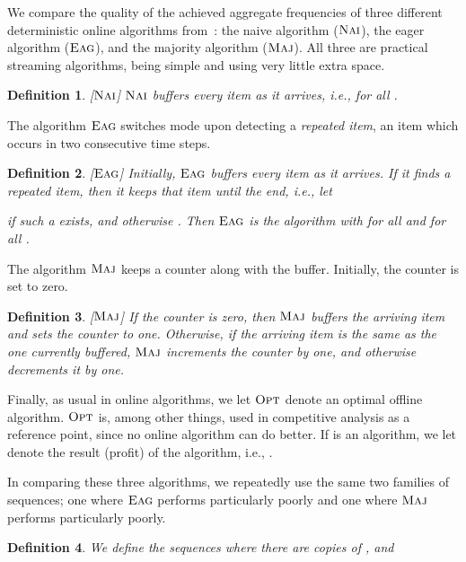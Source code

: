 \documentclass[11pt]{article}
\newtheorem{xdefinition}{Definition}
\newenvironment{definition}{\begin{xdefinition}\rm}{\hspace*{\fill}\raisebox{-1pt}{\boldmath}\end{xdefinition}}
\newcommand{\opt}{{\ensuremath{\textsc{Opt}}}\xspace}
\newcommand{\maj}{{\ensuremath{\textsc{Maj}}}\xspace}
\newcommand{\nav}{{\ensuremath{\textsc{Nai}}}\xspace}
\newcommand{\eag}{{\ensuremath{\textsc{Eag}}}\xspace}
\newcommand{\majnospace}{{\ensuremath{\textsc{Maj}}}}
\newcommand{\navnospace}{{\ensuremath{\textsc{Nai}}}}
\newcommand{\eagnospace}{{\ensuremath{\textsc{Eag}}}}
\begin{document}
We compare the quality of the achieved aggregate frequencies
of three different deterministic online algorithms
from~\cite{Giannakopoulos12}:
the naive algorithm (\nav), the eager algorithm (\eag),
and the majority algorithm (\maj).
All three are practical streaming 
algorithms, being simple and using very little extra space.

\begin{definition}\label{def:nav}
\mbox{\rm [\navnospace]} \nav buffers every item as it arrives,
i.e.,  for all .
\end{definition}

The algorithm \eag switches mode upon detecting a {\em repeated item}, an
item which occurs in two consecutive time steps.
\begin{definition}\label{def:eag}
\mbox{\rm [\eagnospace]} Initially, \eag buffers every item as it arrives.
If it finds a repeated item, then it keeps
that item until the end, i.e., let

if such a  exists, and otherwise .
Then \eag is the algorithm with  for all  and
 for all .
\end{definition}


The algorithm \maj keeps a counter along with the buffer.
Initially, the counter is set to zero.
\begin{definition}\label{def:maj}
\mbox{\rm [\majnospace]}
If the counter is zero, then \maj buffers the arriving item and sets the counter to one.
Otherwise, if the arriving item is the same as the one currently buffered,
\maj increments the counter by one, and otherwise decrements it by one.
\end{definition}

Finally, as usual in online algorithms, we let \opt denote an optimal
offline algorithm. \opt is, among other things, used in competitive
analysis as a reference point, since no online algorithm can do better.
If  is an algorithm, we let  denote the result (profit)
of the algorithm, i.e., .

In comparing these three algorithms, we repeatedly
use the same two families of sequences;
one where \eag performs particularly poorly and one where \maj
performs particularly poorly.

\begin{definition}\label{sequences}
We define the sequences
 where there are  copies of , and

\end{definition}
\end{document}

